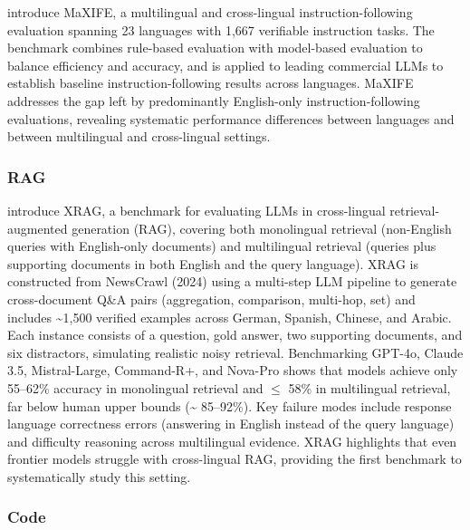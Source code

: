 \documentclass[acmsmall]{acmart}
\begin{document}
\citep{liu2025maxifemultilingualcrosslingualinstruction} introduce MaXIFE, a multilingual and cross-lingual instruction-following evaluation spanning 23 languages with 1,667 verifiable instruction tasks. The benchmark combines rule-based evaluation with model-based evaluation to balance efficiency and accuracy, and is applied to leading commercial LLMs to establish baseline instruction-following results across languages. MaXIFE addresses the gap left by predominantly English-only instruction-following evaluations, revealing systematic performance differences between languages and between multilingual and cross-lingual settings.

\subsubsection{RAG}
\noindent
 \citep{liu2025xragcrosslingualretrievalaugmentedgeneration} introduce XRAG, a benchmark for evaluating LLMs in cross-lingual retrieval-augmented generation (RAG), covering both monolingual retrieval (non-English queries with English-only documents) and multilingual retrieval (queries plus supporting documents in both English and the query language). XRAG is constructed from NewsCrawl (2024) using a multi-step LLM pipeline to generate cross-document Q\&A pairs (aggregation, comparison, multi-hop, set) and includes \textasciitilde 1,500 verified examples across German, Spanish, Chinese, and Arabic. Each instance consists of a question, gold answer, two supporting documents, and six distractors, simulating realistic noisy retrieval. Benchmarking GPT-4o, Claude 3.5, Mistral-Large, Command-R+, and Nova-Pro shows that models achieve only 55–62\% accuracy in monolingual retrieval and $\leq$
58\% in multilingual retrieval, far below human upper bounds (\textasciitilde
85–92\%). Key failure modes include response language correctness errors (answering in English instead of the query language) and difficulty reasoning across multilingual evidence. XRAG highlights that even frontier models struggle with cross-lingual RAG, providing the first benchmark to systematically study this setting.

\subsubsection{Code}
\noindent
\end{document}
